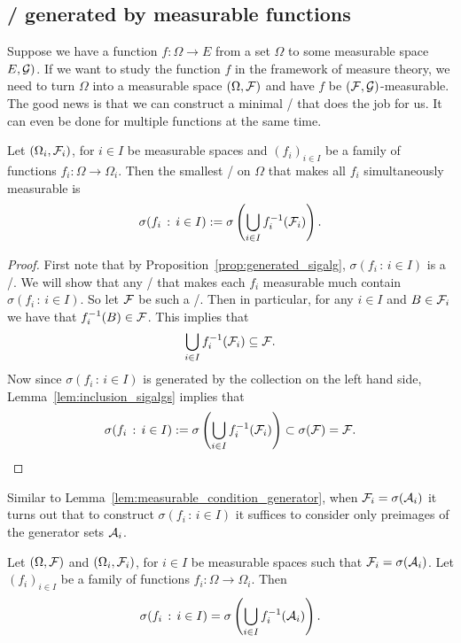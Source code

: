 \subsection{\sigalgs/ generated by measurable functions}

Suppose we have a function $f : \Omega \to E$ from a set $\Omega$ to some measurable space $E, \mathcal G)$. If we want to study the function $f$ in the framework of measure theory, we need to turn $\Omega$ into a measurable space $(\Omega, \mathcal F)$ and have $f$ be $(\mathcal F, \mathcal G)$-measurable. The good news is that we can construct a minimal \sigalg/ that does the job for us. It can even be done for multiple functions at the same time.

\begin{proposition}\label{prop:sigalg_generated_functions}
Let $(\Omega_i, \mathcal F_i)$, for $i \in I$ be measurable spaces and $(f_i)_{i \in I}$ be a family of functions $f_i : \Omega \to \Omega_i$. Then the smallest \sigalg/ on $\Omega$ that makes all $f_i$ simultaneously measurable is
\[
	\sigma(f_i \, : \, i \in I):=\sigma\left(\bigcup_{i \in I} f_i^{-1}(\mathcal F_i)\right).
\] 
\end{proposition}

\begin{proof}
First note that by Proposition~\ref{prop:generated_sigalg}, $\sigma(f_i \, : \, i \in I)$ is a \sigalg/. We will show that any \sigalg/ that makes each $f_i$ measurable much contain $\sigma(f_i \, : \, i \in I)$. So let $\mathcal F$ be such a \sigalg/. Then in particular, for any $i\in I$ and $B \in \mathcal F_i$ we have that $f_i^{-1}(B) \in \mathcal F$. This implies that
\[
	\bigcup_{i \in I} f_i^{-1}(\mathcal F_i) \subseteq \mathcal F.
\]
Now since $\sigma(f_i \, : \, i \in I)$ is generated by the collection on the left hand side, Lemma~\ref{lem:inclusion_sigalgs} implies that 
\[
	\sigma(f_i \, : \, i \in I):=\sigma\left(\bigcup_{i \in I} f_i^{-1}(\mathcal F_i)\right) \subset \sigma(\mathcal F) = \mathcal F.\qedhere
\]
\end{proof}

Similar to Lemma~\ref{lem:measurable_condition_generator}, when $\mathcal F_i = \sigma(\mathcal A_i)$ it turns out that to construct $\sigma(f_i \, : \, i \in I)$ it suffices to consider only preimages of the generator sets $\mathcal A_i$.

\begin{proposition}\label{prop:extension_measurable_function}
Let $(\Omega, \mathcal F)$ and $(\Omega_i, \mathcal F_i)$, for $i \in I$ be measurable spaces such that $\mathcal F_i = \sigma(\mathcal A_i)$. Let $(f_i)_{i \in I}$ be a family of functions $f_i : \Omega \to \Omega_i$. Then 
\[
	\sigma(f_i \, : \, i \in I) = \sigma\left(\bigcup_{i \in I} f_i^{-1}(\mathcal A_i)\right).
\] 
\end{proposition}

